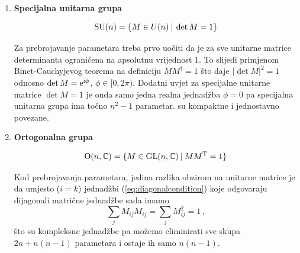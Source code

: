 \begin{enumerate}[leftmargin=0pt, itemindent=0pt]
Važno svojstvo unitarnih matrica je da, ukoliko ih interpretiramo kao
operatore nad kompleksnim vektorskim prostorima ($\vec{x} \to M\vec{x}$), 
one čuvaju skalarni produkt
\begin{align}
    (\vec{x}, \vec{y})& = \sum_{i=1}^n x_{i}^* y_i  \longrightarrow
   \sum_{ijk} M^{*}_{ij}x^{*}_j M_{ik}y_{k} \nonumber \\
 & = \text{uvrštavanjem
 (\ref{eq:unitaritycondition})} = \sum_{kj} \delta_{kj} x^{*}_j y_k = (\vec{x}, \vec{y})
\label{eq:productinvariance}
\end{align}
Lako je pokazati da se ovo može uzeti kao alternativna definicija
unitarne grupe tj. da se unitarne matrice mogu definirati kao one koje
čuvaju ovaj skalarni produkt, a onda je svojstvo $M^{\dagger} M = 1$, koje
smo ovdje uzeli kao definiciono, samo posljedica.

\item \textbf{Specijalna unitarna grupa}

\begin{equation}
\mathrm{SU}(n) = \{ M\in U(n) \: | \: \det M  = 1\}
\end{equation}

Za prebrojavanje parametara treba prvo uočiti da je za sve unitarne
matrice determinanta ograničena na apsolutnu vrijednost 1. To slijedi
primjenom Binet-Cauchyjevog teorema na definiciju $M M^{\dagger} = 1$
što daje $|\det M|^2 = 1$ odnosno $\det M = \textrm{e}^{\textrm{i} \phi}$, 
$\phi\in [0, 2\pi)$.
Dodatni uvjet za specijalne unitarne matrice $\det M = 1$ je onda
samo jedna realna jednadžba $\phi = 0$ pa specijalna unitarna grupa
ima točno $n^2 - 1$ parametar.  su kompaktne i jednostavno povezane.

\item \textbf{Ortogonalna grupa}

\begin{equation}
\mathrm{O}(n, \mathbb{C}) = \{ M\in \mathrm{GL}(n,\mathbb{C}) \: | \: M M^{\mathrm{T}} = 1\}
\end{equation}

Kod prebrojavanja parametara, jedina razlika obzirom na unitarne matrice
je da umjesto ($i=k$) jednadžbi (\ref{eq:diagonalcondition}) 
koje odgovaraju dijagonali matrične jednadžbe sada imamo
\begin{equation}
 \sum_j M_{ij} M_{ij} = \sum_j M_{ij}^2 = 1 \,,
\end{equation}
što su kompleksne jednadžbe pa možemo eliminirati sve skupa
$2n + n(n-1)$ parametara i ostaje ih samo $n(n-1)$.


\end{enumerate}
